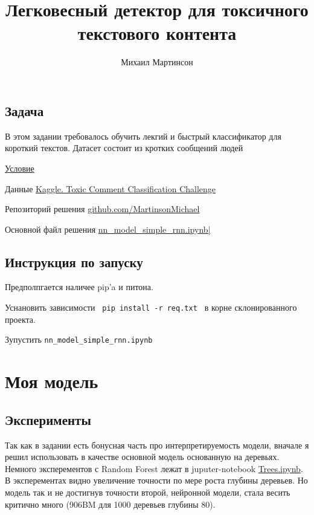 \documentclass[13pt,a4paper]{article}
\title{Легковесный детектор для токсичного текстового контента}
\author{Михаил Мартинсон}
\theoremstyle{remark}
\begin{document}
	\maketitle
	
	\label{firstpage}
	
	\subsection*{Задача}
	
	В этом задании требовалось обучить лекгий и быстрый классификатор для короткий текстов. Датасет состоит из кротких сообщений людей
	
	
	\href{https://github.com/MartinsonMichael/VK_Lab_intro/blob/master/%D0%9F%D1%80%D0%B8%D0%BA%D0%BB%D0%B0%D0%B4%D0%BD%D1%8B%D0%B5%20%D0%B8%D1%81%D1%81%D0%BB%D0%B5%D0%B4%D0%BE%D0%B2%D0%B0%D0%BD%D0%B8%D1%8F%20.pdf}{Условие}
		
	Данные \href{https://www.kaggle.com/c/jigsaw-toxic-comment-classification-challenge/overview}{Kaggle. Toxic Comment Classification Challenge}
	
	Репозиторий решения \href{https://github.com/MartinsonMichael/VK_Lab_intro}{github.com/MartinsonMichael}
		
	Основной файл решения \href{https://github.com/MartinsonMichael/VK_Lab_intro/blob/master/nn_model_simple_rnn.ipynb}{nn\_model\_simple\_rnn.ipynb|}

	\subsection*{Инструкция по запуску}
	
	Предполпгается наличее pip'a и питона. 
	
	Уснановить зависимости \verb| pip install -r req.txt | в корне склонированного проекта.
	
	Зупустить \verb|nn_model_simple_rnn.ipynb| 
	
	
	\section{Моя модель}
	
	\subsection*{Эксперименты}
	
	Так как в задании есть бонусная часть про интерпретируемость модели, вначале я решил использовать в качестве основной модель основанную на деревьях. Немного эксперементов с Random Forest лежат в juputer-notebook
	\href{https://github.com/MartinsonMichael/VK_Lab_intro/blob/master/Trees.ipynb}{Trees.ipynb}. В эксперементах видно увеличение точности по мере роста глубины деревьев. Но модель так и не достигнув точности второй, нейронной модели, стала весить критично много (906BM для 1000 деревьев глубины 80).
	
\end{document}
